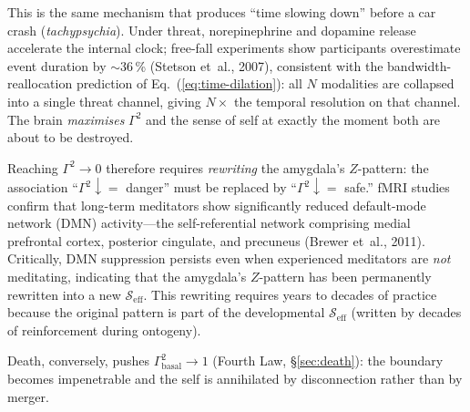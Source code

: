 \documentclass[aps,pre,twocolumn,superscriptaddress,floatfix]{revtex4-2}
\begin{document}
\begin{remark}
This is the same mechanism that produces ``time
slowing down'' before a car crash
(\emph{tachypsychia}).
Under threat, norepinephrine and dopamine release
accelerate the internal clock; free-fall experiments
show participants overestimate event duration by
$\sim$36\,\% (Stetson et~al., 2007), consistent with
the bandwidth-reallocation prediction of
Eq.~(\ref{eq:time-dilation}): all $N$ modalities
are collapsed into a single threat channel, giving
$N\times$ the temporal resolution on that channel.
The brain \emph{maximises} $\Gamma^2$ and the sense
of self at exactly the moment both are about to be
destroyed.

Reaching $\Gamma^2 \to 0$ therefore requires
\emph{rewriting} the amygdala's $Z$-pattern: the
association ``$\Gamma^2 \downarrow =$ danger'' must be
replaced by ``$\Gamma^2 \downarrow =$ safe.''
fMRI studies confirm that long-term meditators show
significantly reduced default-mode network (DMN)
activity---the self-referential network comprising
medial prefrontal cortex, posterior cingulate, and
precuneus (Brewer et~al., 2011).
Critically, DMN suppression persists even when
experienced meditators are \emph{not} meditating,
indicating that the amygdala's $Z$-pattern has been
permanently rewritten into a new
$\mathcal{S}_{\text{eff}}$.
This rewriting requires years to decades of practice
because the original pattern is part of the
developmental $\mathcal{S}_{\text{eff}}$ (written by
decades of reinforcement during ontogeny).

Death, conversely, pushes $\Gamma^2_{\text{basal}}
\to 1$ (Fourth Law, \S\ref{sec:death}):
the boundary becomes impenetrable and the self is
annihilated by disconnection rather than by merger.
\end{remark}
\end{document}
